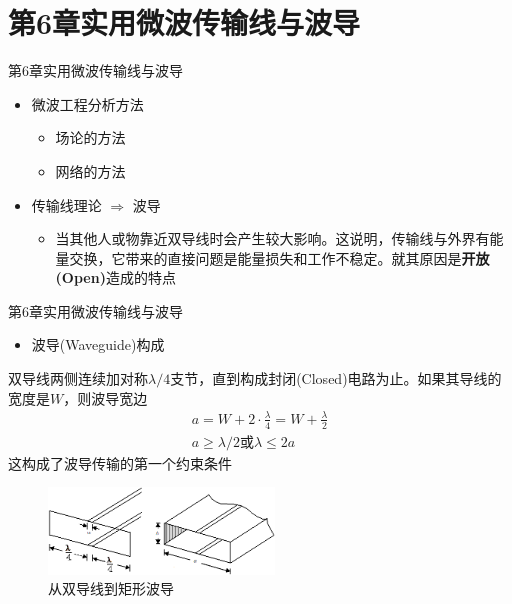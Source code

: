 \section{第6章\quad 实用微波传输线与波导}
\begin{frame}{第6章\quad 实用微波传输线与波导}
    \begin{itemize}
        \item 微波工程分析方法
              \begin{itemize}
                  \item 场论的方法
                  \item 网络的方法
              \end{itemize}
    \end{itemize}
    \begin{itemize}
        \item 传输线理论 $\Longrightarrow$ 波导
              \begin{itemize}
                  \item 当其他人或物靠近双导线时会产生较大影响。这说明，传输线与外界有能量交换，它带来的直接问题是能量损失和工作不稳定。就其原因是\textbf{开放(Open)}造成的特点
              \end{itemize}
    \end{itemize}
\end{frame}

\begin{frame}{第6章\quad 实用微波传输线与波导}
    \begin{itemize}
        \item 波导(Waveguide)构成
    \end{itemize}
    双导线两侧连续加对称$\lambda/4$支节，直到构成封闭(Closed)电路为止。如果其导线的宽度是$W$，则波导宽边
    \begin{align*}
        a=W+2\cdot \frac{\lambda}{4}=W+\frac{\lambda}{2} \\
        a\geqslant \lambda/2 或 \lambda\leqslant 2a
    \end{align*}
    这构成了波导传输的第一个约束条件 \\
    \centering
    \begin{figure}
        \includegraphics[width=6cm]{Cha6//fig6-0.png}
        \caption{从双导线到矩形波导}
    \end{figure}
\end{frame}

